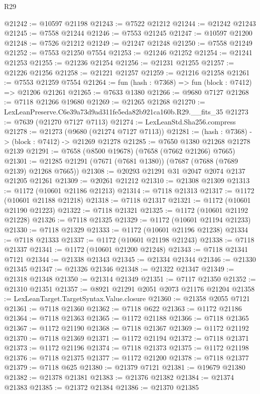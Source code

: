 \begin{lexlean}{R29}
\begin{coremodule}
@21242 := @10597 @21198
@21243 := @7522 @21212
@21244 := @21242 @21243
@21245 := @7558 @21244
@21246 := @7553 @21245
@21247 := @10597 @21200
@21248 := @7526 @21212
@21249 := @21247 @21248
@21250 := @7558 @21249
@21252 := @7553 @21250 @7554
@21253 := @21246 @21252
@21254 := @21241 @21253
@21255 := @21236 @21254
@21256 := @21231 @21255
@21257 := @21226 @21256
@21258 := @21221 @21257
@21259 := @21216 @21258
@21261 := @7553 @21259 @7554
@21264 := fun (hash : @7368) => fun (block : @7412) => @21206 @21261
@21265 := @7633 @1380
@21266 := @9680 @7127
@21268 := @7118 @21266 @19680
@21269 := @21265 @21268
@21270 := LexLeanPreserve.C6e39a73d9ad311fe5eda82b921ca160b.R29.__fits_35
@21273 := @7639 (@21270 @7127 @7113)
@21274 := LexLeanStd.Sha256.compress
@21278 := @21273 (@9680 (@21274 @7127 @7113))
@21281 := (hash : @7368) -> (block : @7412) -> @21269 @21278
@21285 := @7650 @1380 @21268 @21278 @2139
@21291 := @7658 (@8500 @19678) (@7658 (@7662 @21266) @7665)
@21301 := @21285 @21291 (@7671 (@7681 @1380)) (@7687 (@7688 (@7689 @2139) @21268 @7665))
@21308 := @20293 @21291 @31 @2047 @2074 @2137 @21205 @21261
@21309 := @20261 @21212
@21310 := @21308 @21309
@21313 := @1172 (@10601 @21186 @21213)
@21314 := @7118 @21313
@21317 := @1172 (@10601 @21188 @21218)
@21318 := @7118 @21317
@21321 := @1172 (@10601 @21190 @21223)
@21322 := @7118 @21321
@21325 := @1172 (@10601 @21192 @21228)
@21326 := @7118 @21325
@21329 := @1172 (@10601 @21194 @21233)
@21330 := @7118 @21329
@21333 := @1172 (@10601 @21196 @21238)
@21334 := @7118 @21333
@21337 := @1172 (@10601 @21198 @21243)
@21338 := @7118 @21337
@21341 := @1172 (@10601 @21200 @21248)
@21343 := @7118 @21341 @7121
@21344 := @21338 @21343
@21345 := @21334 @21344
@21346 := @21330 @21345
@21347 := @21326 @21346
@21348 := @21322 @21347
@21349 := @21318 @21348
@21350 := @21314 @21349
@21351 := @7117 @21350
@21352 := @21310 @21351
@21357 := @8921 @21291 @2051 @2073 @21176 @21204
@21358 := LexLeanTarget.TargetSyntax.Value.closure
@21360 := @21358 @2055 @7121
@21361 := @7118 @21360
@21362 := @7118 @622
@21363 := @1172 @21186
@21364 := @7118 @21363
@21365 := @1172 @21188
@21366 := @7118 @21365
@21367 := @1172 @21190
@21368 := @7118 @21367
@21369 := @1172 @21192
@21370 := @7118 @21369
@21371 := @1172 @21194
@21372 := @7118 @21371
@21373 := @1172 @21196
@21374 := @7118 @21373
@21375 := @1172 @21198
@21376 := @7118 @21375
@21377 := @1172 @21200
@21378 := @7118 @21377
@21379 := @7118 @625
@21380 := @21379 @7121
@21381 := @19679 @21380
@21382 := @21378 @21381
@21383 := @21376 @21382
@21384 := @21374 @21383
@21385 := @21372 @21384
@21386 := @21370 @21385

\end{coremodule}
\end{lexlean}
